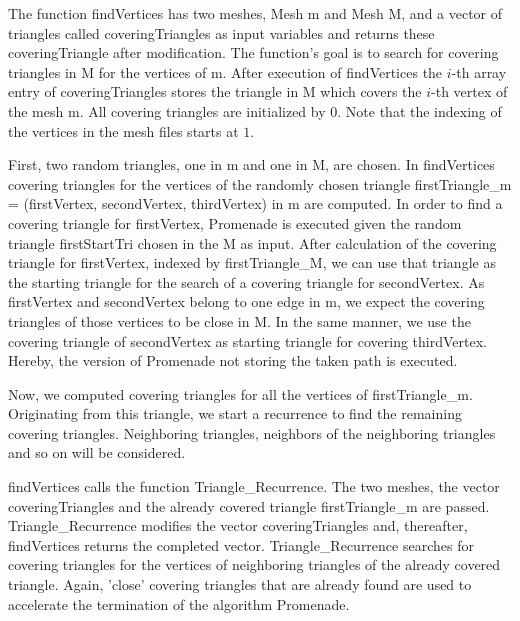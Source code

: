 \documentclass[10pt]{article}
\begin{document}
The function {\ttfamily findVertices} has two meshes, {\ttfamily Mesh m} and {\ttfamily Mesh M}, and a vector of triangles called {\ttfamily coveringTriangles} as input variables and returns these {\ttfamily coveringTriangle} after modification. The function's goal is to search for covering triangles in {\ttfamily M} for the vertices of {\ttfamily  m}. After execution of {\ttfamily findVertices} the $i$-th array entry of {\ttfamily coveringTriangles} stores the triangle in {\ttfamily M} which covers the $i$-th vertex of the mesh {\ttfamily m}. All covering triangles are initialized by $0$. Note that the indexing of the vertices in the mesh files starts at $1$.

First, two random triangles, one in {\ttfamily m} and one in {\ttfamily M}, are chosen. In {\ttfamily findVertices} covering triangles for the vertices of the randomly chosen triangle {\ttfamily firstTriangle\_m = (firstVertex, secondVertex, thirdVertex)} in {\ttfamily m} are computed. In order to find a covering triangle for {\ttfamily firstVertex}, {\ttfamily Promenade} is executed given the random triangle {\ttfamily firstStartTri} chosen in the {\ttfamily M} as input. After calculation of the covering triangle for {\ttfamily firstVertex}, indexed by {\ttfamily firstTriangle\_M}, we can use that triangle as the starting triangle for the search of a covering triangle for {\ttfamily secondVertex}. As {\ttfamily firstVertex} and {\ttfamily secondVertex} belong to one edge in {\ttfamily m}, we expect the covering triangles of those vertices to be close in {\ttfamily M}. In the same manner, we use the covering triangle of {\ttfamily secondVertex} as starting triangle for covering {\ttfamily thirdVertex}. Hereby, the version of {\ttfamily Promenade} not storing the taken path is executed.

Now, we computed covering triangles for all the vertices of {\ttfamily firstTriangle\_m}. Originating from this triangle, we start a recurrence to find the remaining covering triangles. Neighboring triangles, neighbors of the neighboring triangles and so on will be considered.

{\ttfamily findVertices} calls the function {\ttfamily Triangle\_Recurrence}. The two meshes, the vector {\ttfamily coveringTriangles} and the already covered triangle {\ttfamily firstTriangle\_m} are passed. {\ttfamily Triangle\_Recurrence} modifies the vector {\ttfamily coveringTriangles} and, thereafter, {\ttfamily findVertices} returns the completed vector. {\ttfamily Triangle\_Recurrence} searches for covering triangles for the vertices of neighboring triangles of the already covered triangle. Again, 'close' covering triangles that are already found are used to accelerate the termination of the algorithm {\ttfamily Promenade}.
\end{document}
